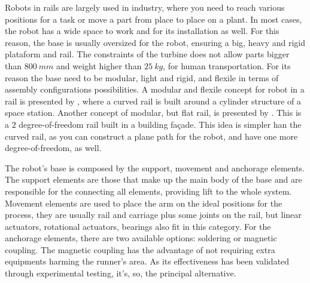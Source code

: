 Robots in rails are largely used in industry, where you need to reach various
positions for a task or move a part from place to place on a plant.
In most cases, the robot has a wide space to work and for its installation as
well. For this reason, the base is usually oversized for the robot, ensuring a
big, heavy and rigid plataform and rail. The constraints of the turbine does not
allow parts bigger than $800~mm$ and weight higher than $25~kg$, for human
transportation.
For its reason the base need to be modular, light and rigid, and flexile in
terms of assembly configurations possibilities.
A modular and flexile concept for robot in a rail is presented by
\cite{Chen2012}, where a curved rail is built around a cylinder structure of a
space station.
Another concept of modular, but flat rail, is presented by \cite{Moon2015}. This
is a $2$ degree-of-freedom rail built in a building façade. This idea is simpler
han the curved rail, as you can construct a plane path for the robot, and have
one more degree-of-freedom, as well.

The robot's base is composed by the support, movement and anchorage elements.
The support elements are those that make up the main body of the base and are
responsible for the connecting all elements, providing lift to the whole system.
Movement elements are used to place the arm on the ideal positions for the
process, they  are usually rail and carriage plus some joints on the rail, but
linear actuators, rotational actuators, bearings also fit in this category. For
the anchorage elements, there are two available options: soldering or magnetic
coupling. The magnetic coupling has the advantage of not requiring extra
equipments harming the runner's area. As its effectiveness has been
validated through experimental testing, it's, so, the principal alternative.







